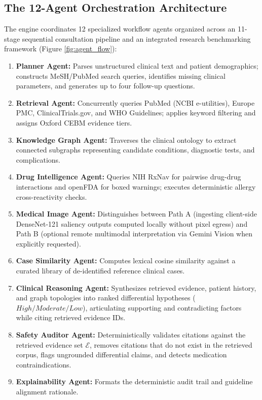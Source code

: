 \documentclass[journal,10pt,twocolumn]{IEEEtran}
\begin{document}
\subsection{The 12-Agent Orchestration Architecture}
The engine coordinates 12 specialized workflow agents organized across an 11-stage sequential consultation pipeline and an integrated research benchmarking framework (Figure \ref{fig:agent_flow}):
\begin{enumerate}
    \item \textbf{Planner Agent:} Parses unstructured clinical text and patient demographics; constructs MeSH/PubMed search queries, identifies missing clinical parameters, and generates up to four follow-up questions.
    \item \textbf{Retrieval Agent:} Concurrently queries PubMed (NCBI e-utilities), Europe PMC, ClinicalTrials.gov, and WHO Guidelines; applies keyword filtering and assigns Oxford CEBM evidence tiers.
    \item \textbf{Knowledge Graph Agent:} Traverses the clinical ontology to extract connected subgraphs representing candidate conditions, diagnostic tests, and complications.
    \item \textbf{Drug Intelligence Agent:} Queries NIH RxNav for pairwise drug-drug interactions and openFDA for boxed warnings; executes deterministic allergy cross-reactivity checks.
    \item \textbf{Medical Image Agent:} Distinguishes between Path A (ingesting client-side DenseNet-121 saliency outputs computed locally without pixel egress) and Path B (optional remote multimodal interpretation via Gemini Vision when explicitly requested).
    \item \textbf{Case Similarity Agent:} Computes lexical cosine similarity against a curated library of de-identified reference clinical cases.
    \item \textbf{Clinical Reasoning Agent:} Synthesizes retrieved evidence, patient history, and graph topologies into ranked differential hypotheses ($High/Moderate/Low$), articulating supporting and contradicting factors while citing retrieved evidence IDs.
    \item \textbf{Safety Auditor Agent:} Deterministically validates citations against the retrieved evidence set $\mathcal{E}$, removes citations that do not exist in the retrieved corpus, flags ungrounded differential claims, and detects medication contraindications.
    \item \textbf{Explainability Agent:} Formats the deterministic audit trail and guideline alignment rationale.

\end{enumerate}
\end{document}
